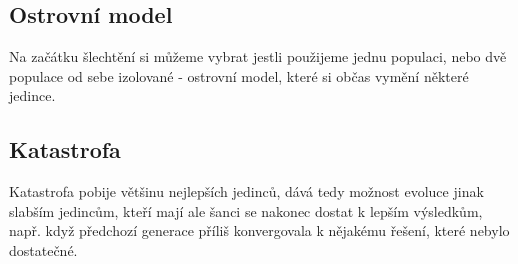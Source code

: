 \documentclass[12pt,a4paper]{article}
\begin{document}
\subsection{Ostrovní model}
Na začátku šlechtění si můžeme vybrat jestli použijeme jednu populaci, nebo dvě populace od sebe izolované - ostrovní model, které si občas vymění některé jedince.
\subsection{Katastrofa}
Katastrofa pobije většinu nejlepších jedinců, dává tedy možnost evoluce jinak slabším jedincům, kteří mají ale šanci se nakonec dostat k lepším výsledkům, např. když předchozí generace příliš konvergovala k nějakému řešení, které nebylo dostatečné.
\end{document}
